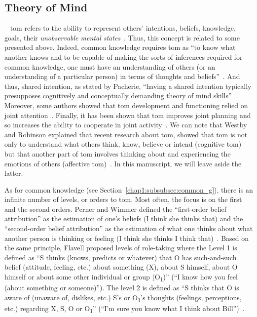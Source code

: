 \documentclass[a4paper,11pt,twoside]{StyleThese}
\begin{document}
\subsection{Theory of Mind}~\label{chap1:subsec:tom}
\acrfull{tom} refers to the ability to represent others' intentions, beliefs, knowledge, goals, \ie their \emph{unobservable mental states}~\cite{premack_1978_does,povinelli_2004_we}. Thus, this concept is related to some presented above. Indeed, common knowledge requires \acrshort{tom} as ``to know what another knows and to be capable of making the sorts of inferences required for common knowledge, one must have an understanding of others (or an understanding of a particular person) in terms of thoughts and beliefs''~\cite[p.~82]{tollefsen_2005_let}. And thus, shared intention, as stated by Pacherie, ``having a shared intention typically presupposes cognitively and conceptually demanding theory of mind skills''~\cite[p.~1817]{pacherie_2013_intentional}. Moreover, some authors showed that \acrshort{tom} development and functioning relied on joint attention~\cite{sodian_2015_declarative, camaioni_2004_role}.  Finally, it has been shown that \acrshort{tom} improves joint planning and so increases the ability to cooperate in joint activity~\cite{astington_1995_theory}. We can note that Westby and Robinson explained that recent research about \acrshort{tom}, showed that \acrshort{tom} is not only to understand what others think, know, believe or intend (cognitive \acrshort{tom}) but that another part of \acrshort{tom} involves thinking about and experiencing the emotions of others (affective \acrshort{tom})~\cite{westby_2014_developmental}. In this manuscript, we will leave aside the latter.

As for common knowledge (see Section~\ref{chap1:subsubsec:common_g}), there is an infinite number of levels, or orders to \acrshort{tom}. Most often, the focus is on the first and the second orders. Perner and Wimmer defined the ``first-order belief attribution'' as the estimation of one's beliefs (\eg I think she thinks that) and the ``second-order belief attribution'' as the estimation of what one  thinks about what another person is thinking or feeling (\eg I think she thinks I think that)~\cite{perner_1985_john}. Based on the same principle, Flavell \etal{} proposed levels of role-taking where the Level 1 is defined as ``S thinks (knows, predicts or whatever) that O has such-and-such belief (attitude, feeling, etc.) about something (X), about S himself, about O himself or about some other individual or group (O\textsubscript{1})'' (\eg ``I know how you feel (about something or someone)''). The level 2 is defined as ``S thinks that O is aware of (unaware of, dislikes, etc.) S's or O\textsubscript{1}'s thoughts (feelings, perceptions, etc.) regarding X, S, O or O\textsubscript{1}'' (\eg ``I'm sure you know what I think about Bill'')~\cite[pp.~49--51]{flavell_1968_development}.
\end{document}
